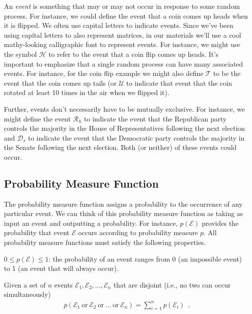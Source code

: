 \documentclass[assignment01_Solutions]{subfiles}
\begin{document}
An \emph{event} is something that may or may not occur in response to some random process.  For instance, we could define the event that a coin comes up heads when it is flipped.  We often use capital letters to indicate events.  Since we've been using capital letters to also represent matrices, in our materials we'll use a cool mathy-looking calligraphic font to represent events.  For instance, we might use the symbol $\mathcal{H}$ to refer to the event that a coin flip comes up heads. It's important to emphasize that a single random process can have many associated events.   For instance, for the coin flip example we might also define $\mathcal{T}$ to be the event that the coin comes up tails (or $\mathcal{U}$ to indicate that event that the coin rotated at least 10 times in the air when we flipped it).

Further, events don't necessarily have to be mutually exclusive.  For instance, we might define the event $\mathcal{R}_h$ to indicate the event that the Republican party controls the majority in the House of Representatives following the next election and $\mathcal{D}_s$ to indicate the event that the Democratic party controls the majority in the Senate following the next election.  Both (or neither) of these events could occur.

\subsection{Probability Measure Function}
The probability measure function assigns a probability to the occurrence of any particular event.  We can think of this probability measure function as taking as input an event and outputting a probability.  For instance, $p(\mathcal{E})$ provides the probability that event $\mathcal{E}$ occurs according to probability measure $p$.  All probability measure functions must satisfy the following properties.

\bi
\item $0 \leq p(\mathcal{E}) \leq 1$: the probability of an event ranges from 0 (an impossible event) to 1 (an event that will always occur).
\item Given a set of $n$ events $\mathcal{E}_1, \mathcal{E}_2, \ldots, \mathcal{E}_n$ that are disjoint (i.e., no two can occur simultaneously)
\begin{align}
p(\mathcal{E}_1~\mbox{or}~\mathcal{E}_2~\mbox{or}~\ldots~\mbox{or}~\mathcal{E}_n) = \sum_{i=1}^n p(\mathcal{E}_i) \label{eq:probunion} \enspace .
\end{align}
\end{document}
